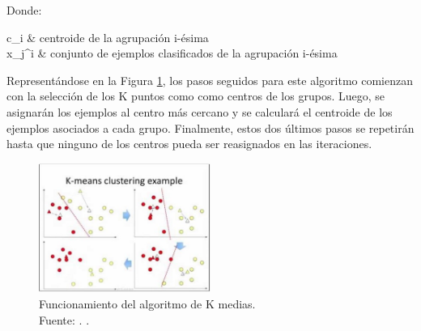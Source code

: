 \begin{itemize}
	Donde:
	\begin{conditions}
		c_i   &  centroide de la agrupación i-ésima \\
		x_j^i   &  conjunto de ejemplos clasificados de la agrupación i-ésima
	\end{conditions}
	
	Representándose en la Figura \ref{2:fig3}, los pasos seguidos para este algoritmo comienzan con la selección de los K puntos como como centros de los grupos. Luego, se asignarán los ejemplos al centro más cercano y se calculará el centroide de los ejemplos asociados a cada grupo. Finalmente, estos dos últimos pasos se repetirán hasta que ninguno de los centros pueda ser reasignados en las iteraciones.
	\begin{figure}[h]
		\begin{center}
			\includegraphics[width=0.50\textwidth]{2/figures/kmeans.jpg}
			\caption[Funcionamiento del algoritmo de K medias]{Funcionamiento del algoritmo de K medias.\\
			Fuente: \cite{tec_sancho2018supnosup}. .}
			\label{2:fig3}
		\end{center}
	\end{figure}
		

\end{itemize}
